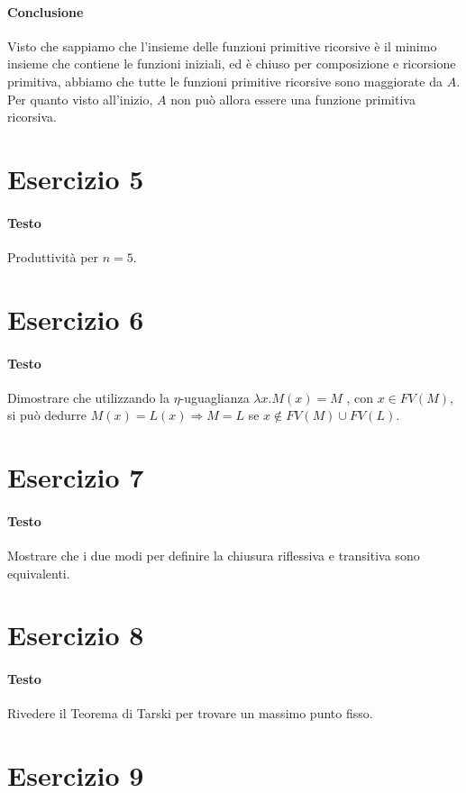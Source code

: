 \documentclass[a4paper,10pt]{article}
\begin{document}
\paragraph{Conclusione}
Visto che sappiamo che l'insieme delle funzioni primitive ricorsive è il minimo insieme che contiene le funzioni iniziali, ed è chiuso per composizione e ricorsione primitiva, abbiamo che tutte le funzioni primitive ricorsive sono maggiorate da $A$. Per quanto visto all'inizio, $A$ non può allora essere una funzione primitiva ricorsiva.

\section*{Esercizio 5}
\paragraph{Testo}
Produttività per $n=5$.

\section*{Esercizio 6}
\paragraph{Testo}
Dimostrare che utilizzando la $\eta$-uguaglianza $\lambda x.M(x) = M$ , con $x \in FV(M)$, si può dedurre $M(x) = L(x) \Rightarrow M = L$ se $x \notin F V (M ) \cup F V (L)$.

\section*{Esercizio 7}
\paragraph{Testo}
Mostrare che i due modi per definire la chiusura riflessiva e transitiva sono equivalenti.

\section*{Esercizio 8}
\paragraph{Testo}
Rivedere il Teorema di Tarski per trovare un massimo punto fisso.

\section*{Esercizio 9}
\end{document}
